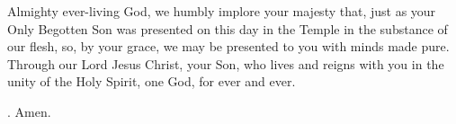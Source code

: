 \lettrine[lines=3]{A}{}lmighty ever-living God,
we humbly implore your majesty
that, just as your Only Begotten Son
was presented on this day in the Temple
in the substance of our flesh,
so, by your grace,
we may be presented to you with minds made pure.
Through our Lord Jesus Christ, your Son,
who lives and reigns with you in the unity of the Holy Spirit,
one God, for ever and ever. \par \Rbar. Amen.

